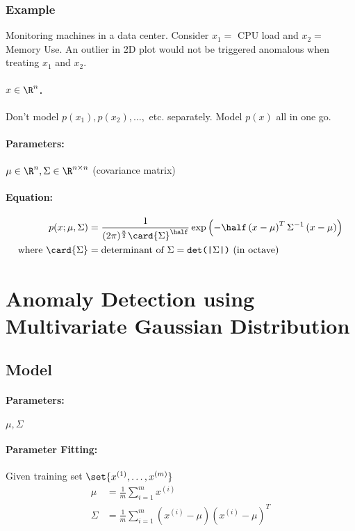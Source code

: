 \subsubsection{Example}
Monitoring machines in a data center. Consider $x_1 =$ CPU load and $x_2 =$ Memory Use.
An outlier in 2D plot would not be triggered anomalous when treating $x_1$ and $x_2$.

\paragraph{$x \in \R^n$.} Don't model $p(x_1), p(x_2), \dots, $ etc. separately. Model
$p(x)$ all in one go.

\paragraph{Parameters:} $\mu \in \R^n, \Sigma \in \R^{n\times n}$ (covariance matrix)

\paragraph{Equation:}
\begin{align*}
    p(x; \mu, \Sigma)           & = \frac{1}{(2\pi)^{\frac{n}{2}}\card{\Sigma}^\half}
    \exp{\left(-\half\left(x-\mu\right)^T\Sigma^{-1}\left(x-\mu\right)\right)}        \\
    \text{where } \card{\Sigma} & = \text{determinant of } \Sigma =
    \texttt{det(|$\Sigma$|)} \text{ (in octave)}         \\
\end{align*}

\section{Anomaly Detection using Multivariate Gaussian Distribution}
\subsection{Model}
\paragraph{Parameters:} $\mu, \Sigma$
\paragraph{Parameter Fitting:} Given training set $\set{x^{(1)}, \dots, x^{(m)}}$
\begin{align*}
    \mu    & = \frac{1}{m}\sum_{i=1}^m x^{(i)}             \\
    \Sigma & = \frac{1}{m}\sum_{i=1}^m
    \left(x^{(i)} - \mu\right)\left(x^{(i)} - \mu\right)^T \\
\end{align*}

